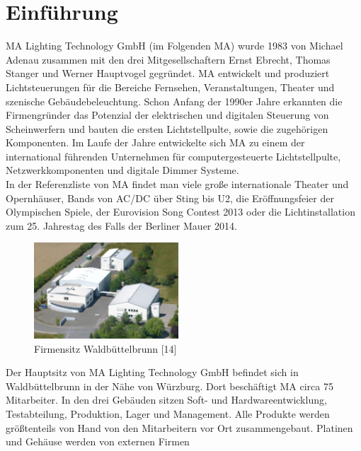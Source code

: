 \documentclass[11pt]{scrartcl}
\begin{document}
\section{Einführung}
MA Lighting Technology GmbH (im Folgenden MA) wurde 1983 von Michael Adenau zusammen mit
den drei Mitgesellschaftern Ernst Ebrecht, Thomas Stanger und Werner Hauptvogel gegründet. MA
entwickelt und produziert Lichtsteuerungen für die Bereiche Fernsehen, Veranstaltungen, Theater
und szenische Gebäudebeleuchtung. Schon Anfang der 1990er Jahre erkannten die Firmengründer
das Potenzial der elektrischen und digitalen Steuerung von Scheinwerfern und bauten die ersten
Lichtstellpulte, sowie die zugehörigen Komponenten. Im Laufe der Jahre entwickelte sich MA zu
einem der international führenden Unternehmen für computergesteuerte Lichtstellpulte,
Netzwerkkomponenten und digitale Dimmer Systeme.\\
In der Referenzliste von MA findet man viele große internationale Theater und Opernhäuser, Bands
von AC/DC über Sting bis U2, die Eröffnungsfeier der Olympischen Spiele, der Eurovision Song
Contest 2013 oder die Lichtinstallation zum 25. Jahrestag des Falls der Berliner Mauer 2014.\\
\begin{figure}
    \vspace{-20pt}
    \begin{center}
      \includegraphics[width=0.48\textwidth]{images/csm_MA_building_WBB.jpg}
    \end{center}
    \vspace{-20pt}
    \caption{Firmensitz Waldbüttelbrunn [14]}
    \vspace{-10pt}
  \end{figure}
Der Hauptsitz von MA Lighting Technology GmbH
befindet sich in Waldbüttelbrunn in der Nähe von
Würzburg. Dort beschäftigt MA circa 75 Mitarbeiter. In
den drei Gebäuden sitzen Soft- und Hardwareentwicklung,
Testabteilung, Produktion, Lager und
Management. Alle Produkte werden größtenteils von
Hand von den Mitarbeitern vor Ort zusammengebaut.
Platinen und Gehäuse werden von externen Firmen
\end{document}
